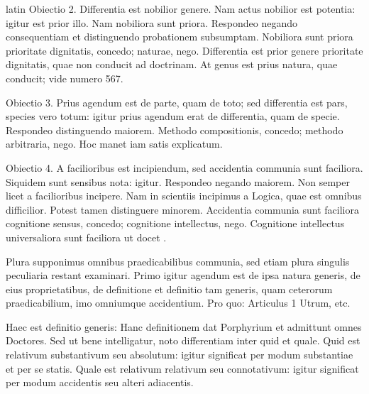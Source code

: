 \begin{otherlanguage*}{latin}
\pstart
Obiectio 2. Differentia est nobilior genere. Nam actus nobilior est potentia:
igitur est prior illo. Nam nobiliora sunt priora. Respondeo negando consequentiam et distinguendo probationem subsumptam. Nobiliora sunt priora prioritate dignitatis, concedo; naturae, nego. Differentia est prior genere prioritate dignitatis, quae non conducit ad doctrinam. At genus est prius natura, quae conducit; vide numero 567. 
\pend

\pstart
Obiectio 3. Prius agendum est de parte, quam de toto; sed differentia est pars, species vero totum:
igitur prius agendum erat de differentia, quam de specie. Respondeo distinguendo maiorem. Methodo compositionis, concedo; methodo arbitraria, nego. Hoc manet iam satis explicatum. 
\pend

\pstart
Obiectio 4. A facilioribus est incipiendum, sed  accidentia communia sunt faciliora. Siquidem sunt sensibus nota:
igitur. Respondeo negando maiorem. Non semper licet a facilioribus incipere. Nam in scientiis incipimus a Logica, quae est omnibus difficilior. Potest tamen distinguere minorem. Accidentia communia sunt faciliora cognitione sensus, concedo; cognitione intellectus, nego. Cognitione intellectus universaliora sunt faciliora ut docet . 
\pend

\pstart
{}
\pend

\pstart
Plura supponimus omnibus praedicabilibus communia, sed etiam plura singulis peculiaria restant examinari. Primo igitur agendum est de ipsa natura generis, de eius proprietatibus, de definitione et definitio tam generis, quam ceterorum praedicabilium, imo omniumque accidentium. Pro quo:
Articulus 1 Utrum, etc. 
\pend

\pstart
{}
\pend

\pstart
Haec est definitio generis:
 Hanc definitionem dat Porphyrium et admittunt omnes Doctores. Sed ut bene intelligatur, noto differentiam inter quid et quale. Quid est relativum substantivum seu absolutum:
igitur significat per modum substantiae et per se statis. Quale est relativum relativum seu connotativum:
igitur significat per modum accidentis seu alteri adiacentis. 
\pend


\end{otherlanguage*}
